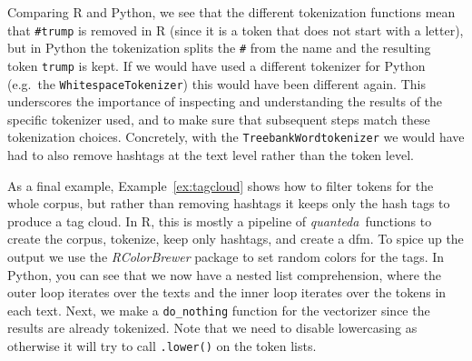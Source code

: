 Comparing R and Python, we see that the different tokenization functions mean that \verb|#trump| is removed in R (since it is a token that does not start with a letter),
but in Python the tokenization splits the \verb|#| from the name and the resulting token \verb|trump| is kept.
If we would have used a different tokenizer for Python (e.g.\ the \texttt{WhitespaceTokenizer}) this would have been different again.
This underscores the importance of inspecting and understanding the results of the specific tokenizer used,
and to make sure that subsequent steps match these tokenization choices.
Concretely, with the \texttt{TreebankWordtokenizer} we would have had to also remove hashtags at the text level rather than the token level.


As a final example, Example~\ref{ex:tagcloud} shows how to filter tokens for the whole corpus, but rather than removing hashtags it keeps only the hash tags to produce a tag cloud.
In R, this is mostly a pipeline of \emph{quanteda}\ functions to create the corpus, tokenize, keep only hashtags, and create a dfm.
To spice up the output we use the \emph{RColorBrewer} package to set random colors for the tags.
In Python, you can see that we now have a nested list comprehension, where the outer loop iterates over the texts and the inner loop iterates over the tokens in each text.
Next, we make a \verb|do_nothing| function for the vectorizer since the results are already tokenized.
Note that we need to disable lowercasing as otherwise it will try to call \verb|.lower()| on the token lists.





